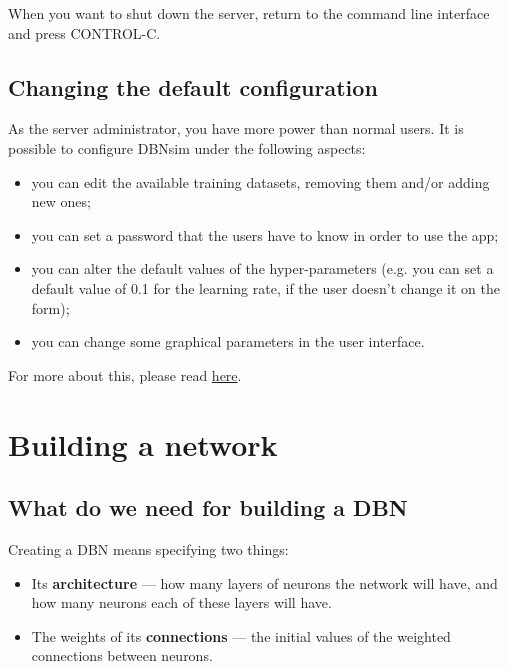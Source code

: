\documentclass[a4paper]{article}
\begin{document}
When you want to shut down the server, return to the command line interface and press CONTROL-C.

		
	\subsection{Changing the default configuration}

		
As the server administrator, you have more power than normal users. It is possible to configure DBNsim under the following aspects:
		
	\begin{itemize}
		
			
	\item you can edit the available training datasets, removing them and/or adding new ones;
			
	\item you can set a password that the users have to know in order to use the app;
			
	\item you can alter the default values of the hyper-parameters (e.g. you can set a default value of 0.1 for the learning rate, if the user doesn't change it on the form);
			
	\item you can change some graphical parameters in the user interface.
		
	\end{itemize}

		
For more about this, please read \href{05_admin.html}{here}.
	


		
	\section{Building a network}


		
	\subsection{What do we need for building a DBN}

		
Creating a DBN means specifying two things:
		
	\begin{itemize}
		
			
	\item Its \textbf{architecture} --- how many layers of neurons the network will have, and how many neurons each of these layers will have.
			
	\item The weights of its \textbf{connections} --- the initial values of the weighted connections between neurons.
		
	\end{itemize}
\end{document}
